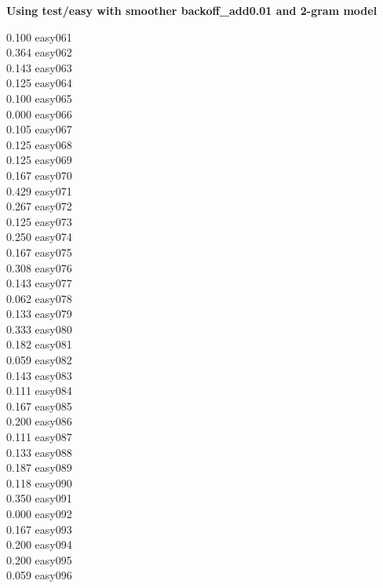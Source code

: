 \documentclass[10pt]{article}
\begin{document}
\begin{enumerate}
\begin{enumerate}
            \textbf{Using test/easy with smoother backoff\_add0.01 and 2-gram model}
            \begin{multicols}{5}
            0.100 easy061\\
            0.364 easy062\\
            0.143 easy063\\
            0.125 easy064\\
            0.100 easy065\\
            0.000 easy066\\
            0.105 easy067\\
            0.125 easy068\\
            0.125 easy069\\
            0.167 easy070\\
            0.429 easy071\\
            0.267 easy072\\
            0.125 easy073\\
            0.250 easy074\\
            0.167 easy075\\
            0.308 easy076\\
            0.143 easy077\\
            0.062 easy078\\
            0.133 easy079\\
            0.333 easy080\\
            0.182 easy081\\
            0.059 easy082\\
            0.143 easy083\\
            0.111 easy084\\
            0.167 easy085\\
            0.200 easy086\\
            0.111 easy087\\
            0.133 easy088\\
            0.187 easy089\\
            0.118 easy090\\
            0.350 easy091\\
            0.000 easy092\\
            0.167 easy093\\
            0.200 easy094\\
            0.200 easy095\\
            0.059 easy096\\

\end{multicols}
\end{enumerate}
\end{enumerate}
\end{document}
